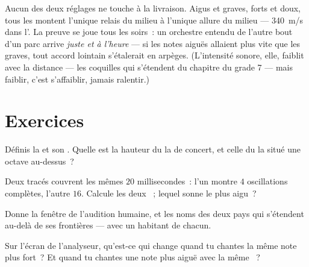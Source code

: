 \begin{example}\label{ex:g8:sound-pitch-loudness:speed}
Aucun des deux réglages ne touche à la livraison. Aigus et graves,
forts et doux, tous les  montent l'unique relais du milieu à
l'unique allure du milieu --- \qty{340}{m/s} dans l'. La preuve se
joue tous les soirs~: un orchestre entendu de l'autre bout d'un parc
arrive \emph{juste et à l'heure} --- si les notes aiguës allaient plus
vite que les graves, tout accord lointain s'étalerait en arpèges.
(L'intensité sonore, elle, faiblit avec la distance --- les coquilles
qui s'étendent du chapitre du grade 7 --- mais faiblir, c'est
s'affaiblir, jamais ralentir.)
\end{example}

\section{Exercices}

\begin{exercise}[$\star$]\label{exo:g8:sound-pitch-loudness:1}
Définis la  et son . Quelle est la hauteur du la de
concert, et celle du la situé une octave au-dessus~?
\end{exercise}

\begin{exercise}[$\star$]\label{exo:g8:sound-pitch-loudness:2}
Deux tracés couvrent les mêmes $20$ millisecondes~: l'un montre $4$
oscillations complètes, l'autre $16$. Calcule les deux ~;
lequel sonne le plus aigu~?
\end{exercise}

\begin{exercise}[$\star$]\label{exo:g8:sound-pitch-loudness:3}
Donne la fenêtre de l'audition humaine, et les noms des deux pays qui
s'étendent au-delà de ses frontières --- avec un habitant de chacun.
\end{exercise}

\begin{exercise}[$\star$]\label{exo:g8:sound-pitch-loudness:4}
Sur l'écran de l'analyseur, qu'est-ce qui change quand tu chantes la
même note plus fort~? Et quand tu chantes une note plus aiguë avec la
même ~?
\end{exercise}

